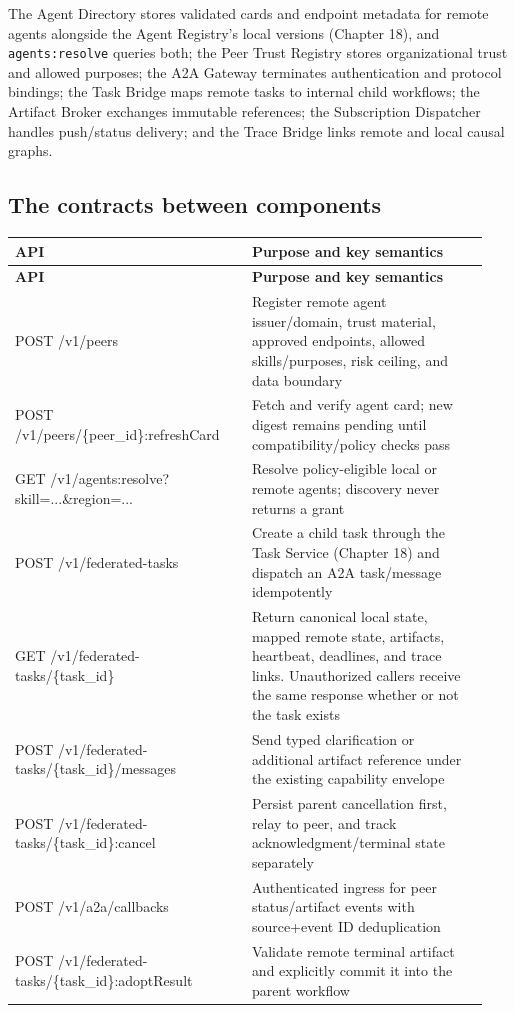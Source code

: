 The Agent Directory stores validated cards and endpoint metadata for remote agents alongside the Agent Registry's local versions (Chapter 18), and \lstinline[style=bookinline]!agents:resolve! queries both; the Peer Trust Registry stores organizational trust and allowed purposes; the A2A Gateway terminates authentication and protocol bindings; the Task Bridge maps remote tasks to internal child workflows; the Artifact Broker exchanges immutable references; the Subscription Dispatcher handles push/status delivery; and the Trace Bridge links remote and local causal graphs.\par

\subsection{The contracts between components}

\BookTableStart
\small
\begin{longtable}{@{}Y{0.4700\linewidth}Y{0.4700\linewidth}@{}}
\color{white}\bfseries \textbf{API} & \color{white}\bfseries \textbf{Purpose and key semantics} \\
\endfirsthead
{}
\color{white}\bfseries \textbf{API} & \color{white}\bfseries \textbf{Purpose and key semantics} \\
\endhead
POST /v1/peers & Register remote agent issuer/domain, trust material, approved endpoints, allowed skills/purposes, risk ceiling, and data boundary \\
POST /v1/peers/\{peer\_id\}:refreshCard & Fetch and verify agent card; new digest remains pending until compatibility/policy checks pass \\
GET /v1/agents:resolve?skill=...\&region=... & Resolve policy-eligible local or remote agents; discovery never returns a grant \\
POST /v1/federated-tasks & Create a child task through the Task Service (Chapter 18) and dispatch an A2A task/message idempotently \\
GET /v1/federated-tasks/\{task\_id\} & Return canonical local state, mapped remote state, artifacts, heartbeat, deadlines, and trace links. Unauthorized callers receive the same response whether or not the task exists \\
POST /v1/federated-tasks/\{task\_id\}/messages & Send typed clarification or additional artifact reference under the existing capability envelope \\
POST /v1/federated-tasks/\{task\_id\}:cancel & Persist parent cancellation first, relay to peer, and track acknowledgment/terminal state separately \\
POST /v1/a2a/callbacks & Authenticated ingress for peer status/artifact events with source+event ID deduplication \\
POST /v1/federated-tasks/\{task\_id\}:adoptResult & Validate remote terminal artifact and explicitly commit it into the parent workflow \\
\end{longtable}
\BookTableEnd

